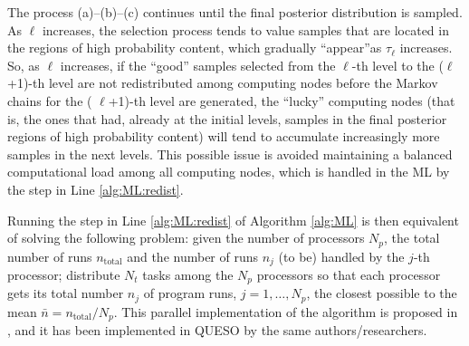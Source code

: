 The process (a)--(b)--(c) continues until the final posterior distribution is
sampled.  As $\ell$ increases, the selection process tends to value samples
that are located in the regions of high probability content, which gradually
``appear''as  $\tau_\ell$ increases. So, as $\ell$ increases, if the ``good''
samples selected from the  $\ell$-th level to the ($\ell$+1)-th level are not
redistributed among computing nodes before the Markov chains for the (
$\ell$+1)-th level are generated, the ``lucky'' computing nodes (that is, the
ones that had, already at the initial levels, samples in the final posterior
regions of high probability content) will tend to accumulate increasingly more
samples in the next levels. This possible issue is avoided maintaining a
balanced computational load among all computing nodes, which is handled in the
ML by the step in Line \ref{alg:ML:redist}. 

Running the step in Line \ref{alg:ML:redist} of Algorithm \ref{alg:ML} is then
equivalent of solving the following problem: given the number of processors
$N_p$, the total number of runs $n_\text{total}$ and the number of runs $n_j$
(to be) handled by the $j$-th processor; distribute $N_t$ tasks among the $N_p$
processors so that each processor gets its total number $n_j$ of program runs,
$j = 1, \ldots, N_p$, the closest possible to the mean
$\bar{n}=n_\text{total}/N_p$. This parallel implementation of the algorithm is
proposed in \cite{CheungPrudencio2012}, and it has been implemented in QUESO by
the same authors/researchers.

% 







